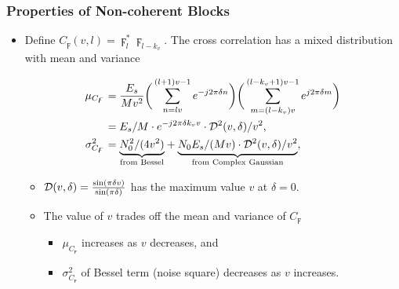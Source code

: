 \begin{frame}
  \frametitle{Properties of Non-coherent Blocks}

    \begin{itemize}
    
      \item Define $C_{\digamma}(v,l)=\digamma_l^*\digamma_{l-k_v}$. The cross correlation has a mixed distribution with mean and variance

      \begin{equation*}
        \begin{aligned}
        \label{eq:mean_var_product_coherent_int}
        \mu_{C_{\digamma}}&=\frac{E_s}{Mv^2}\bigg(\sum_{n=lv}^{(l+1)v-1}e^{-j2\pi \delta n}\bigg)\bigg(\sum_{m=(l-k_v)v}^{(l-k_v+1)v-1}e^{j2\pi \delta m}\bigg) \\
        &=E_s/M\cdot e^{-j2\pi \delta k_vv}\cdot\mathcal{D}^2(v,\delta)/v^2, \\
        \sigma^2_{C_{\digamma}}&={\underbrace{N_0^2/(4v^2)}_{\text{from Bessel}}}+{\underbrace{N_0E_s/(Mv)\cdot\mathcal{D}^2(v,\delta)/v^2}_{\text{from Complex Gaussian}}},
        \end{aligned}
      \end{equation*}

      \begin{itemize}
        \item $\mathcal{D}(v,\delta)=\frac{\sin(\pi \delta v)}{\sin(\pi\delta)}$ 
        has the maximum value $v$ at $\delta=0$.
        \item The value of $v$ trades off the mean and variance of $C_{\digamma}$ 
        \begin{itemize}
          \item $\mu_{C_{\digamma}}$ increases as $v$ decreases, and
          \item $ \sigma^2_{C_{\digamma}}$ of Bessel term (noise square) decreases as $v$ increases.
        \end{itemize}
      \end{itemize}
    

    \end{itemize}



\end{frame}


